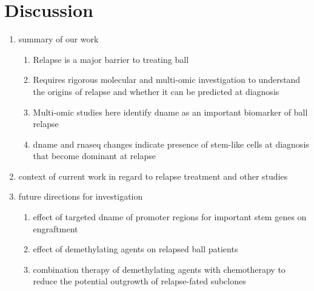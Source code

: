 \section{Discussion}

\begin{enumerate}
  \item summary of our work
  \begin{enumerate}
    \item Relapse is a major barrier to treating \gls{ball}
    \item Requires rigorous molecular and multi-omic investigation to understand the origins of relapse and whether it can be predicted at diagnosis
    \item Multi-omic studies here identify \gls{dname} as an important biomarker of \gls{ball} relapse
    \item \gls{dname} and \gls{rnaseq} changes indicate presence of stem-like cells at diagnosis that become dominant at relapse
  \end{enumerate}
  \item context of current work in regard to relapse treatment and other studies
  \item future directions for investigation
  \begin{enumerate}
    \item effect of targeted \gls{dname} of promoter regions for important stem genes on engraftment
    \item effect of demethylating agents on relapsed \gls{ball} patients
    \item combination therapy of demethylating agents with chemotherapy to reduce the potential outgrowth of relapse-fated subclones
  \end{enumerate}
\end{enumerate}